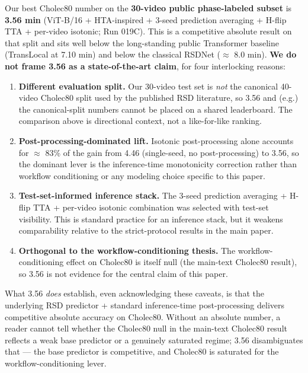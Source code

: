 Our best Cholec80 number on the \textbf{30-video public phase-labeled
subset} is \textbf{3.56 min} (ViT-B/16 + HTA-inspired + 3-seed
prediction averaging + H-flip TTA + per-video isotonic; Run 019C). This
is a competitive absolute result on that split and sits well below the
long-standing public Transformer baseline (TransLocal at 7.10 min) and
below the classical RSDNet ($\approx$ 8.0 min). \textbf{We do not frame 3.56 as
a state-of-the-art claim}, for four interlocking reasons:

\begin{enumerate}
\def\labelenumi{\arabic{enumi}.}
\tightlist
\item
  \textbf{Different evaluation split.} Our 30-video test set is
  \emph{not} the canonical 40-video Cholec80 split used by the published
  RSD literature, so 3.56 and (e.g.) the canonical-split numbers cannot
  be placed on a shared leaderboard. The comparison above is directional
  context, not a like-for-like ranking.
\item
  \textbf{Post-processing-dominated lift.} Isotonic post-processing
  alone accounts for $\approx$ 83\% of the gain from 4.46 (single-seed, no
  post-processing) to 3.56, so the dominant lever is the inference-time
  monotonicity correction rather than workflow conditioning or any
  modeling choice specific to this paper.
\item
  \textbf{Test-set-informed inference stack.} The 3-seed prediction
  averaging + H-flip TTA + per-video isotonic combination was selected
  with test-set visibility. This is standard practice for an inference
  stack, but it weakens comparability relative to the strict-protocol
  results in the main paper.
\item
  \textbf{Orthogonal to the workflow-conditioning thesis.} The
  workflow-conditioning effect on Cholec80 is itself null (the main-text Cholec80 result), so
  3.56 is not evidence for the central claim of this paper.
\end{enumerate}

What 3.56 \emph{does} establish, even acknowledging these caveats, is
that the underlying RSD predictor + standard inference-time
post-processing delivers competitive absolute accuracy on Cholec80.
Without an absolute number, a reader cannot tell whether the Cholec80
null in the main-text Cholec80 result reflects a weak base predictor or a genuinely saturated
regime; 3.56 disambiguates that --- the base predictor is competitive,
and Cholec80 is saturated for the workflow-conditioning lever.

